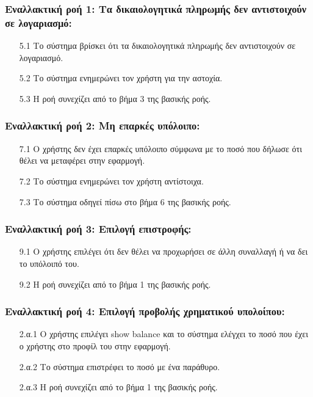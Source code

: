 \documentclass[12pt,a4paper]{article}
\begin{document}
\subsubsection*{Εναλλακτική ροή 1: Τα δικαιολογητικά πληρωμής δεν αντιστοιχούν σε λογαριασμό:}
\begin{enumerate}
    \item [5.1] Το σύστημα βρίσκει ότι τα δικαιολογητικά πληρωμής δεν αντιστοιχούν σε λογαριασμό.
    \item [5.2] Το σύστημα ενημερώνει τον χρήστη για την αστοχία.
    \item [5.3] Η ροή συνεχίζει από το βήμα 3 της βασικής ροής.
\end{enumerate}

\subsubsection*{Εναλλακτική ροή 2: Μη επαρκές υπόλοιπο:}
\begin{enumerate}
    \item [7.1] Ο χρήστης δεν έχει επαρκές υπόλοιπο σύμφωνα με το ποσό που δήλωσε ότι θέλει να μεταφέρει στην εφαρμογή.
    \item [7.2] Το σύστημα ενημερώνει τον χρήστη αντίστοιχα.
    \item [7.3] Το σύστημα οδηγεί πίσω στο βήμα 6 της βασικής ροής.
\end{enumerate}

\subsubsection*{Εναλλακτική ροή 3: Επιλογή επιστροφής:}
\begin{enumerate}
    \item [9.1] Ο χρήστης επιλέγει ότι δεν θέλει να προχωρήσει σε άλλη συναλλαγή ή να δει το υπόλοιπό του.
    \item [9.2] Η ροή συνεχίζει από το βήμα 1 της βασικής ροής.
\end{enumerate}

\subsubsection*{Εναλλακτική ροή 4: Επιλογή προβολής χρηματικού υπολοίπου:}
\begin{enumerate}
    \item [2.α.1] Ο χρήστης επιλέγει show balance και το σύστημα ελέγχει το ποσό που έχει ο χρήστης στο προφίλ του στην εφαρμογή.
    \item [2.α.2] Το σύστημα επιστρέφει το ποσό με ένα παράθυρο.
    \item [2.α.3] Η ροή συνεχίζει από το βήμα 1 της βασικής ροής.
\end{enumerate}
\end{document}
